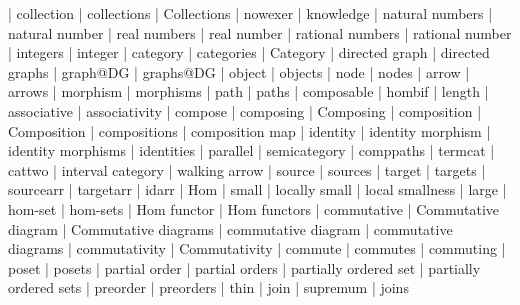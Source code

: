    |   collection
    |   collections
    |   Collections
    |   nowexer
    |   knowledge
    |   natural numbers
    |   natural number
    |   real numbers
    |   real number
    |   rational numbers
    |   rational number
    |   integers
    |   integer
    |   category
    |   categories
    |   Category
    |   directed graph
    |   directed graphs
    |   graph@DG
    |   graphs@DG
    |   object
    |   objects
    |   node
    |   nodes
    |   arrow
    |   arrows
    |   morphism
    |   morphisms
    |   path
    |   paths
    |   composable
    |   hombif
    |   length
    |   associative
    |   associativity
    |   compose
    |   composing
    |   Composing
    |   composition
    |   Composition
    |   compositions
    |   composition map
    |   identity
    |   identity morphism
    |   identity morphisms
    |   identities
    |   parallel
    |   semicategory
    |   comppaths
    |   termcat
    |   cattwo
    |   interval category
    |   walking arrow
    |   source
    |   sources
    |   target
    |   targets
    |   sourcearr
    |   targetarr
    |   idarr
    |   Hom
    |   small
    |   locally small
    |   local smallness
    |   large
    |   hom-set
    |   hom-sets
    |   Hom functor
    |   Hom functors
    |   commutative
    |   Commutative diagram
    |   Commutative diagrams
    |   commutative diagram
    |   commutative diagrams
    |   commutativity
    |   Commutativity
    |   commute
    |   commutes
    |   commuting
    |   poset
    |   posets
    |   partial order
    |   partial orders
    |   partially ordered set
    |   partially ordered sets
    |   preorder
    |   preorders
    |   thin
    |   join
    |   supremum
    |   joins
